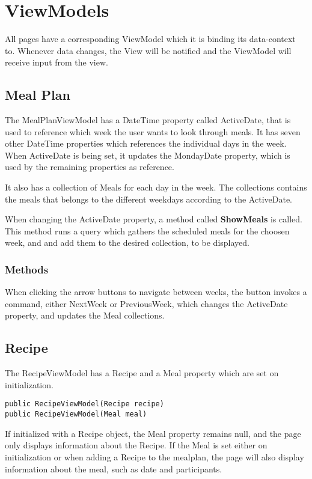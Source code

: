 \section{ViewModels}
All pages have a corresponding ViewModel which it is binding its data-context to. Whenever data changes, the View will be notified and the ViewModel will receive input from the view.

\subsection{Meal Plan}
The MealPlanViewModel has a DateTime property called ActiveDate, that is used to reference which week the user wants to look through meals. It has seven other DateTime properties which references the individual days in the week. When ActiveDate is being set, it updates the MondayDate property, which is used by the remaining properties as reference.

It also has a collection of Meals for each day in the week. The collections contains the meals that belongs to the different weekdays according to the ActiveDate.

When changing the ActiveDate property, a method called \textbf{ShowMeals} is called. This method runs a query which gathers the scheduled meals for the choosen week, and and add them to the desired collection, to be displayed. 

\subsubsection{Methods}
When clicking the arrow buttons to navigate between weeks, the button invokes a command, either NextWeek or PreviousWeek, which changes the ActiveDate property, and updates the Meal collections.


\subsection{Recipe}

The RecipeViewModel has a Recipe and a Meal property which are set on initialization.
\begin{lstlisting}[caption=Recipe ViewModel Constructors., language=CSharp]
public RecipeViewModel(Recipe recipe)
public RecipeViewModel(Meal meal)
\end{lstlisting}
        

If initialized with a Recipe object, the Meal property remains null, and the page only displays information about the Recipe. If the Meal is set either on initialization or when adding a Recipe to the mealplan, the page will also display information about the meal, such as date and participants.

